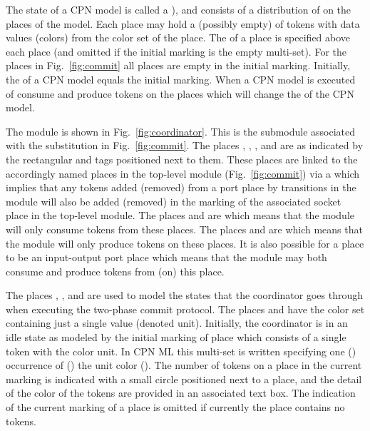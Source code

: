 
The state of a CPN model is called a ), and consists
of a distribution of  on the places of the model. Each
place may hold a (possibly empty)  of tokens with
data values (colors) from the color set of the place. The
 of a place is specified above each place
(and omitted if the initial marking is the empty multi-set). For the
places in Fig.~\ref{fig:commit} all places are empty in the initial
marking. Initially, the  of a CPN model
equals the initial marking. When a CPN model is executed
 of  consume and
produce tokens on the places which will change the  of the CPN model.

 

The  module is shown in
Fig.~\ref{fig:coordinator}. This is the submodule associated with the
 substitution in Fig.~\ref{fig:commit}. The
places , , , and
 are  as indicated by the
rectangular  and  tags positioned next to
them. These places are linked to the accordingly named places in the
top-level module (Fig.~\ref{fig:commit}) via a  which implies that any tokens added (removed) from a
port place by transitions in the  module will
also be added (removed) in the marking of the associated socket place
in the top-level module. The places  and
 are  which means that
the module will only consume tokens from these places.  The places
 and  are  which means that the  module will only
produce tokens on these places. It is also possible for a place to be
an input-output port place which means that the module may both
consume and produce tokens from (on) this place.

The places , , and
 are used to model the states that the
coordinator goes through when executing the two-phase commit
protocol. The places  and  have
the color set  containing just a single value
\smlcode{()} (denoted unit). Initially, the coordinator is in an idle
state as modeled by the initial marking of place  which
consists of a single token with the color unit. In CPN ML this
multi-set is written  specifying one ()
occurrence of () the unit color (\smlcode{()}).  The number
of tokens on a place in the current marking is indicated with a small
circle positioned next to a place, and the detail of the color of the
tokens are provided in an associated text box. The indication of the
current marking of a place is omitted if currently the place contains
no tokens.

